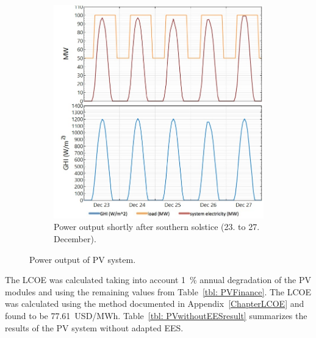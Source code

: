\begin{figure}[!htbp]
\begin{subfigure}[b]{0.5\textwidth}
                \includegraphics[width=1\textwidth]{FIG/PVwithoutEESsummer}
                \caption{Power output shortly after southern solstice (23. to 27. December).}\label{PVwithoutEESsummer}
        \end{subfigure}
        \caption[Power output of PV system.]{Power output of PV system.}\label{PVwithoutEES}
\end{figure}


The LCOE was calculated taking into account \SI{1}{\percent} annual degradation of the PV modules and using the remaining values from Table~\ref{tbl: PVFinance}. The LCOE was calculated using the method documented in Appendix~\ref{ChapterLCOE} and found to be \SI{77.61}{USD/MWh}. Table~\ref{tbl: PVwithoutEESresult} summarizes the results of the PV system without adapted EES.


